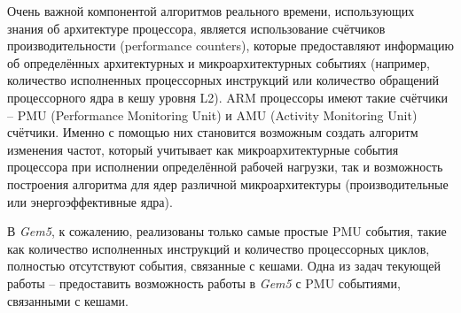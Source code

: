     Очень важной компонентой алгоритмов реального времени, использующих знания об архитектуре
    процессора, является использование счётчиков производительности (performance counters), которые
    предоставляют информацию об определённых архитектурных и микроархитектурных событиях
    (например, количество исполненных процессорных инструкций или количество обращений процессорного
    ядра в кешу уровня L2). ARM процессоры имеют такие счётчики -- PMU (Performance Monitoring Unit)
    и AMU (Activity Monitoring Unit) счётчики. Именно с помощью них становится возможным создать
    алгоритм изменения частот, который учитывает как микроархитектурные события процессора
    при исполнении определённой рабочей нагрузки, так и возможность построения алгоритма для
    ядер различной микроархитектуры (производительные или энергоэффективные ядра).

    В \textit{Gem5}, к сожалению, реализованы только самые простые PMU события, такие как количество
    исполненных инструкций и количество процессорных циклов, полностью отсутствуют события, связанные с
    кешами. Одна из задач текующей работы -- предоставить возможность работы в \textit{Gem5} с PMU
    событиями, связанными с кешами.

\newpage
